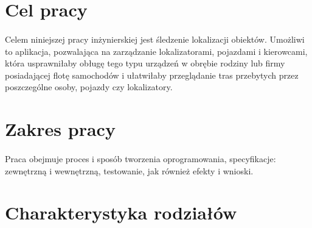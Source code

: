 \section{Cel pracy}
\paragraph{}
Celem niniejszej pracy inżynierskiej jest śledzenie lokalizacji obiektów. Umożliwi to aplikacja, pozwalająca na zarządzanie lokalizatorami, pojazdami i kierowcami, która usprawniłaby obługę tego typu urządzeń w obrębie rodziny lub firmy posiadającej flotę samochodów i ułatwiłaby przeglądanie tras przebytych przez poszczególne osoby, pojazdy czy lokalizatory.

\section{Zakres pracy}
\paragraph{}
 Praca obejmuje proces i sposób tworzenia oprogramowania, specyfikacje: zewnętrzną i wewnętrzną, testowanie, jak również efekty i wnioski.

\section{Charakterystyka rodziałów}
